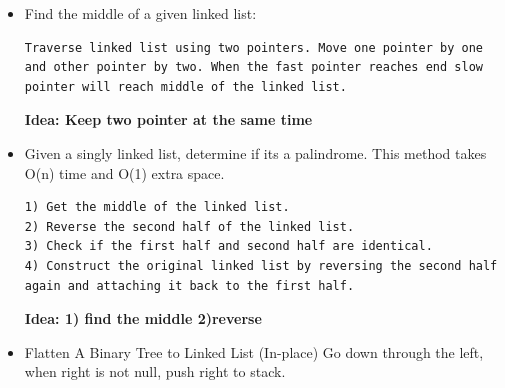 \documentclass[a4paper,12pt,twoside]{book}
\begin{document}
\begin{itemize}
\item Find the middle of a given linked list: 
\begin{lstlisting}[breaklines]
Traverse linked list using two pointers. Move one pointer by one and other pointer by two. When the fast pointer reaches end slow pointer will reach middle of the linked list.
\end{lstlisting}
\textbf{Idea: Keep two pointer at the same time}

\item Given a singly linked list, determine if its a palindrome. This method takes O(n) time and O(1) extra space.
\begin{lstlisting}[breaklines]
1) Get the middle of the linked list.
2) Reverse the second half of the linked list.
3) Check if the first half and second half are identical.
4) Construct the original linked list by reversing the second half again and attaching it back to the first half.
\end{lstlisting}
\textbf{Idea: 1) find the middle 2)reverse}

\item Flatten A Binary Tree to Linked List (In-place) 
Go down through the left, when right is not null, push right to stack. \newline


\end{itemize}
\end{document}
